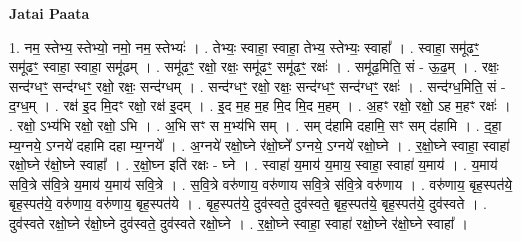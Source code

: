 \documentclass[17pt]{extarticle}
\begin{document}
\textbf{Jatai Paata} \newline

1. नम॒ स्तेभ्य॒ स्तेभ्यो॒ नमो॒ नम॒ स्तेभ्यः॑ । . तेभ्यः॒ स्वाहा॒ स्वाहा॒ तेभ्य॒ स्तेभ्यः॒ स्वाहा᳚ । . स्वाहा॒ समू॑ढꣳ॒॒ समू॑ढꣳ॒॒ स्वाहा॒ स्वाहा॒ समू॑ढम् । . समू॑ढꣳ॒॒ रक्षो॒ रक्षः॒ समू॑ढꣳ॒॒ समू॑ढꣳ॒॒ रक्षः॑ । . समू॑ढ॒मिति॒ सं - ऊ॒ढ॒म् । . रक्षः॒ सन्द॑ग्धꣳ॒॒ सन्द॑ग्धꣳ॒॒ रक्षो॒ रक्षः॒ सन्द॑ग्धम् । . सन्द॑ग्धꣳ॒॒ रक्षो॒ रक्षः॒ सन्द॑ग्धꣳ॒॒ सन्द॑ग्धꣳ॒॒ रक्षः॑ । . सन्द॑ग्ध॒मिति॒ सं - द॒ग्ध॒म् । . रक्ष॑ इ॒द मि॒दꣳ रक्षो॒ रक्ष॑ इ॒दम् । . इ॒द म॒ह म॒ह मि॒द मि॒द म॒हम् । . अ॒हꣳ रक्षो॒ रक्षो॒ ऽह म॒हꣳ रक्षः॑ । . रक्षो॒ ऽभ्य॑भि रक्षो॒ रक्षो॒ ऽभि । . अ॒भि सꣳ स म॒भ्य॑भि सम् । . सम् द॑हामि दहामि॒ सꣳ सम् द॑हामि । . द॒हा॒ म्य॒ग्नये॒ ऽग्नये॑ दहामि दहा म्य॒ग्नये᳚ । . अ॒ग्नये॑ रक्षो॒घ्ने र॑क्षो॒घ्ने᳚ ऽग्नये॒ ऽग्नये॑ रक्षो॒घ्ने । . र॒क्षो॒घ्ने स्वाहा॒ स्वाहा॑ रक्षो॒घ्ने र॑क्षो॒घ्ने स्वाहा᳚ । . र॒क्षो॒घ्न इति॑ रक्षः - घ्ने । . स्वाहा॑ य॒माय॑ य॒माय॒ स्वाहा॒ स्वाहा॑ य॒माय॑ । . य॒माय॑ सवि॒त्रे स॑वि॒त्रे य॒माय॑ य॒माय॑ सवि॒त्रे । . स॒वि॒त्रे वरु॑णाय॒ वरु॑णाय सवि॒त्रे स॑वि॒त्रे वरु॑णाय । . वरु॑णाय॒ बृह॒स्पत॑ये॒ बृह॒स्पत॑ये॒ वरु॑णाय॒ वरु॑णाय॒ बृह॒स्पत॑ये । . बृह॒स्पत॑ये॒ दुव॑स्वते॒ दुव॑स्वते॒ बृह॒स्पत॑ये॒ बृह॒स्पत॑ये॒ दुव॑स्वते । . दुव॑स्वते रक्षो॒घ्ने र॑क्षो॒घ्ने दुव॑स्वते॒ दुव॑स्वते रक्षो॒घ्ने । . र॒क्षो॒घ्ने स्वाहा॒ स्वाहा॑ रक्षो॒घ्ने र॑क्षो॒घ्ने स्वाहा᳚ । \newline
\end{document}
